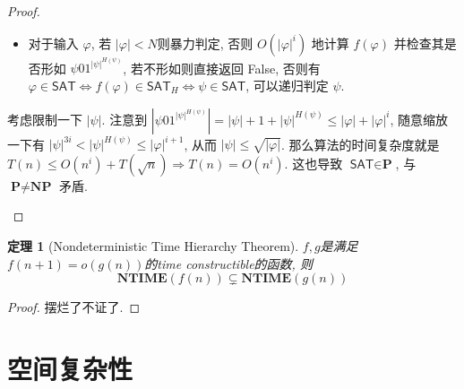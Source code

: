 \documentclass[8pt]{article}
\theoremstyle{compact}
\newtheorem{theorem}{定理}[section]
\def\le{\leqslant}
\def\NTIME{\textbf{NTIME}}
\def\P{\textbf{P}}
\def\NP{\textbf{NP}}
\def\coNP{\textbf{coNP}}
\begin{document}
\begin{proof}
\begin{itemize}
		\begin{itemize}
			\item 对于输入 $\varphi$, 若 $|\varphi| < N$则暴力判定, 否则 $O(|\varphi|^i)$ 地计算 $f(\varphi)$ 并检查其是否形如 $\psi01^{|\psi|^{H(\psi)}}$, 若不形如则直接返回 False, 否则有 $\varphi \in \textsf{SAT} \Leftrightarrow f(\varphi) \in \textsf{SAT}_H \Leftrightarrow \psi \in \textsf{SAT}$, 可以递归判定 $\psi$.
		\end{itemize}
		
		考虑限制一下 $|\psi|$. 注意到 $|\psi01^{|\psi|^{H(\psi)}}| = |\psi| + 1 + |\psi|^{H(\psi)} \le |\varphi| + |\varphi|^i$, 随意缩放一下有 $|\psi|^{3i} < |\psi|^{H(\psi)} \le |\varphi|^{i+1}$, 从而 $|\psi| \le \sqrt{|\varphi|}$. 那么算法的时间复杂度就是 $T(n) \le O(n^i) + T(\sqrt n) \Rightarrow T(n) = O(n^i)$. 这也导致 $\textsf{SAT} \in \P$, 与 $\P \neq \NP$ 矛盾.
	\end{itemize}
\end{proof}
\begin{theorem}[Nondeterministic Time Hierarchy Theorem]
	$f, g$是满足$f(n + 1) = o(g(n))$的time constructible的函数, 则
	$$\NTIME(f(n)) \subsetneq \NTIME(g(n))$$
\end{theorem}
\begin{proof}
	摆烂了不证了.

\end{proof}

\newpage
\section{空间复杂性}
\end{document}
